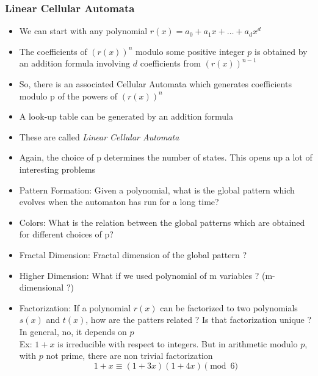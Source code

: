 \documentclass{beamer}
\begin{document}
\begin{frame}
    \frametitle{Linear Cellular Automata}
    \begin{itemize}
        \item We can start with any polynomial $r(x) = a_0 + a_1x+\dots+a_dx^d$
        \item The coefficients of $(r(x))^n$ modulo some positive integer $p$ is obtained by an addition formula involving $d$ coefficients from              $(r(x))^{n-1}$
        \item So, there is an associated Cellular Automata which generates coefficients modulo p of the powers of $(r(x))^n$
        \item A look-up table can be generated by an addition formula
        \item These are called \textit{Linear Cellular Automata}
        \item Again, the choice of p determines the number of states.
        This opens up a lot of interesting problems 
    \end{itemize}
\end{frame}

\begin{frame}
    \begin{itemize}
        \item Pattern Formation: Given a polynomial, what is the global pattern which evolves when the automaton has run for a long time?
        \item Colors: What is the relation between the global patterns which are obtained for different choices of p?
        \item Fractal Dimension: Fractal dimension of the global pattern ?
        \item Higher Dimension: What if we used polynomial of m variables ? (m-dimensional ?)
        \item Factorization: If a polynomial $r(x)$ can be factorized to two polynomials $s(x)$ and $t(x)$, how are the patters related ? Is that factorization unique ? \\
        In general, no, it depends on $p$\\
        Ex: $1+x$ is irreducible with respect to integers. But in arithmetic modulo $p$, with $p$ not prime, there are non trivial factorization
        \begin{equation*}
            1+x \equiv (1+3x)(1+4x) \pmod 6
        \end{equation*}
    \end{itemize}
\end{frame}
\end{document}
